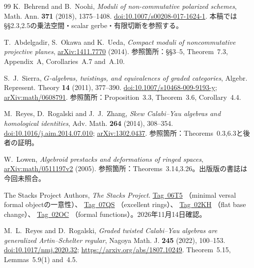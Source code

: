 \documentclass[11pt,a4paper]{ltjsarticle}
\numberwithin{equation}{section}
\begin{document}

\begin{thebibliography}{99}
K.~Behrend and B.~Noohi,
\emph{Moduli of non-commutative polarized schemes},
Math. Ann. \textbf{371} (2018), 1375--1408.
\href{https://doi.org/10.1007/s00208-017-1624-1}{doi:10.1007/s00208-017-1624-1}.
本稿では\S\S2.3,2.5の乗法空間・scalar gerbe・有限切断を参照する。

T.~Abdelgadir, S.~Okawa and K.~Ueda,
\emph{Compact moduli of noncommutative projective planes},
\href{https://arxiv.org/abs/1411.7770}{arXiv:1411.7770} (2014).
参照箇所：\S\S3--5, Theorem~7.3, Appendix~A, Corollaries~A.7 and~A.10.

S.~J.~Sierra,
\emph{$G$-algebras, twistings, and equivalences of graded categories},
Algebr. Represent. Theory \textbf{14} (2011), 377--390.
\href{https://doi.org/10.1007/s10468-009-9193-y}{doi:10.1007/s10468-009-9193-y};
\href{https://arxiv.org/abs/math/0608791}{arXiv:math/0608791}.
参照箇所：Proposition~3.3, Theorem~3.6, Corollary~4.4.

M.~Reyes, D.~Rogalski and J.~J.~Zhang,
\emph{Skew Calabi--Yau algebras and homological identities},
Adv. Math. \textbf{264} (2014), 308--354.
\href{https://doi.org/10.1016/j.aim.2014.07.010}{doi:10.1016/j.aim.2014.07.010};
\href{https://arxiv.org/abs/1302.0437}{arXiv:1302.0437}.
参照箇所：Theorems~0.3,6.3と後者の証明。

W.~Lowen,
\emph{Algebroid prestacks and deformations of ringed spaces},
\href{https://arxiv.org/abs/math/0511197}{arXiv:math/0511197v2} (2005).
参照箇所：Theorems~3.14,3.26。出版版の書誌は今回未照合。

The Stacks Project Authors,
\emph{The Stacks Project}.
\href{https://stacks.math.columbia.edu/tag/06T5}{Tag~06T5}
（minimal versal formal objectの一意性）、
\href{https://stacks.math.columbia.edu/tag/07QS}{Tag~07QS}
（excellent rings）、
\href{https://stacks.math.columbia.edu/tag/02KH}{Tag~02KH}
（flat base change）、
\href{https://stacks.math.columbia.edu/tag/02OC}{Tag~02OC}
（formal functions）。2026年11月14日確認。

M.~L.~Reyes and D.~Rogalski,
\emph{Graded twisted Calabi--Yau algebras are generalized Artin--Schelter regular},
Nagoya Math. J. \textbf{245} (2022), 100--153.
\href{https://doi.org/10.1017/nmj.2020.32}{doi:10.1017/nmj.2020.32};
\url{https://arxiv.org/abs/1807.10249}.
Theorem~5.15, Lemmas~5.9(1) and~4.5.


\end{thebibliography}
\end{document}
